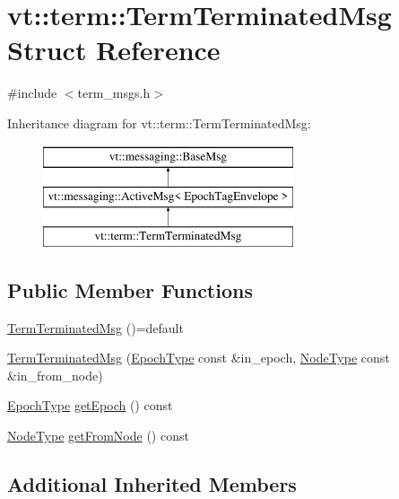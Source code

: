 \hypertarget{structvt_1_1term_1_1_term_terminated_msg}{}\section{vt\+:\+:term\+:\+:Term\+Terminated\+Msg Struct Reference}
\label{structvt_1_1term_1_1_term_terminated_msg}


{\ttfamily \#include $<$term\+\_\+msgs.\+h$>$}

Inheritance diagram for vt\+:\+:term\+:\+:Term\+Terminated\+Msg\+:\begin{figure}[H]
\begin{center}
\leavevmode
\includegraphics[height=3.000000cm]{structvt_1_1term_1_1_term_terminated_msg}
\end{center}
\end{figure}
\subsection*{Public Member Functions}
\begin{DoxyCompactItemize}
\item 
\hyperlink{structvt_1_1term_1_1_term_terminated_msg_aa4d8ff658de9fb4bca91ea687e4ebd9f}{Term\+Terminated\+Msg} ()=default
\item 
\hyperlink{structvt_1_1term_1_1_term_terminated_msg_a067b9cd70d084bb0767c41c8eb05aa29}{Term\+Terminated\+Msg} (\hyperlink{namespacevt_a985a5adf291c34a3ca263b3378388236}{Epoch\+Type} const \&in\+\_\+epoch, \hyperlink{namespacevt_a866da9d0efc19c0a1ce79e9e492f47e2}{Node\+Type} const \&in\+\_\+from\+\_\+node)
\item 
\hyperlink{namespacevt_a985a5adf291c34a3ca263b3378388236}{Epoch\+Type} \hyperlink{structvt_1_1term_1_1_term_terminated_msg_a9008729d246d7cde6ce7b5dfb2dfa204}{get\+Epoch} () const
\item 
\hyperlink{namespacevt_a866da9d0efc19c0a1ce79e9e492f47e2}{Node\+Type} \hyperlink{structvt_1_1term_1_1_term_terminated_msg_a61ee025b8d4918e81bee601a4e7a2c3d}{get\+From\+Node} () const
\end{DoxyCompactItemize}
\subsection*{Additional Inherited Members}


